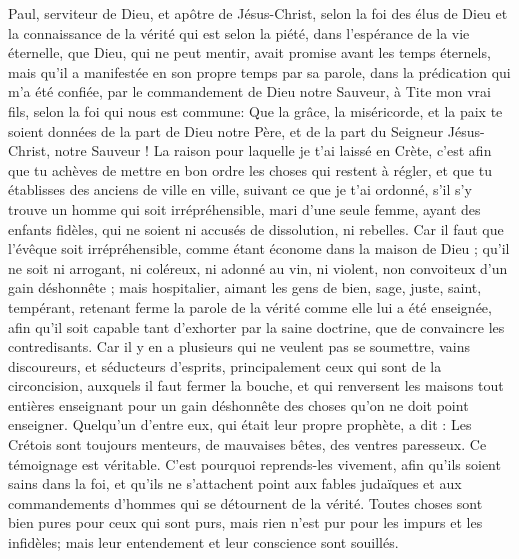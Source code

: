 \begin{multicols}{2}
\VerseOne{}Paul, serviteur de Dieu, et apôtre de Jésus-Christ, selon la foi des élus de Dieu et la connaissance de la vérité qui est selon la piété,
dans l'espérance de la vie éternelle, que Dieu, qui ne peut mentir, avait promise avant les temps éternels,
mais qu'il a manifestée en son propre temps par sa parole, dans la prédication qui m'a été confiée, par le commandement de Dieu notre Sauveur,
à Tite mon vrai fils, selon la foi qui nous est commune: Que la grâce, la miséricorde, et la paix te soient données de la part de Dieu notre Père, et de la part du Seigneur Jésus-Christ, notre Sauveur !
La raison pour laquelle je t'ai laissé en Crète, c'est afin que tu achèves de mettre en bon ordre les choses qui restent à régler, et que tu établisses des anciens de ville en ville, suivant ce que je t'ai ordonné,
s'il s'y trouve un homme qui soit irrépréhensible, mari d'une seule femme, ayant des enfants fidèles, qui ne soient ni accusés de dissolution, ni rebelles.
Car il faut que l'évêque soit irrépréhensible, comme étant économe dans la maison de Dieu ; qu'il ne soit ni arrogant, ni coléreux, ni adonné au vin, ni violent, non convoiteux d'un gain déshonnête ;
mais hospitalier, aimant les gens de bien, sage, juste, saint, tempérant,
retenant ferme la parole de la vérité comme elle lui a été enseignée, afin qu'il soit capable tant d'exhorter par la saine doctrine, que de convaincre les contredisants.
Car il y en a plusieurs qui ne veulent pas se soumettre, vains discoureurs, et séducteurs d'esprits, principalement ceux qui sont de la circoncision,
auxquels il faut fermer la bouche, et qui renversent les maisons tout entières enseignant pour un gain déshonnête des choses qu'on ne doit point enseigner.
Quelqu'un d'entre eux, qui était leur propre prophète, a dit : Les Crétois sont toujours menteurs, de mauvaises bêtes, des ventres paresseux.
Ce témoignage est véritable. C'est pourquoi reprends-les vivement, afin qu'ils soient sains dans la foi,
et qu'ils ne s'attachent point aux fables judaïques et aux commandements d'hommes qui se détournent de la vérité.
Toutes choses sont bien pures pour ceux qui sont purs, mais rien n'est pur pour les impurs et les infidèles; mais leur entendement et leur conscience sont souillés.

\end{multicols}
